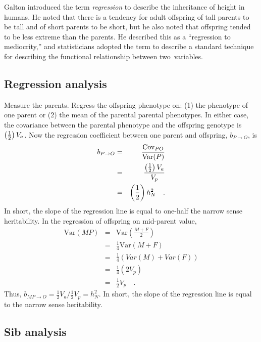 \documentclass[12pt]{article}
\newcommand{\Var}{\mbox{Var}}
\newcommand{\Cov}{\mbox{Cov}}
\begin{document}
Galton introduced the term {\it regression\/} to describe the
inheritance of height in humans. He noted that there is a tendency for
adult offspring of tall parents to be tall and of short parents to be
short, but he also noted that offspring tended to be less extreme than
the parents. He described this as a ``regression to mediocrity,'' and
statisticians adopted the term to describe a standard technique for
describing the functional relationship between two~variables.

\subsection*{Regression analysis}

Measure the parents.  Regress the offspring phenotype on: (1) the
phenotype of one parent or (2) the mean of the parental parental
phenotypes.  In either case, the covariance between the parental
phenotype and the offspring genotype is $\left({1 \over 2}\right)V_a$.
Now the regression coefficient between one parent and offspring, $b_{P
\rightarrow O}$, is
\begin{eqnarray*}
b_{P \rightarrow O}
&=& \frac{\Cov_{PO}}{\Var(P)} \\
&=& {\left({1 \over 2}\right)V_a \over V_p} \\
&=& \left({1 \over 2}\right)h^2_N \quad .
\end{eqnarray*}
In short, the slope of the regression line is equal to one-half the
narrow sense heritability.  In the regression of offspring on
mid-parent value,
\begin{eqnarray*}
\Var(MP) &=& \Var\left(\frac{M+F}{2}\right) \\
                  &=& \frac{1}{4} \Var(M+F) \\
                  &=& \frac{1}{4} \left(Var(M) + Var(F)\right) \\
                  &=& \frac{1}{4} \left(2V_p\right) \\
                  &=& \frac{1}{2} V_p \quad .
\end{eqnarray*}
Thus, $b_{MP \rightarrow O} = \frac{1}{2}V_a/\frac{1}{2}V_p = h^2_N$.
In short, the slope of the regression line is equal to the narrow
sense heritability.

\subsection*{Sib analysis}
\end{document}
